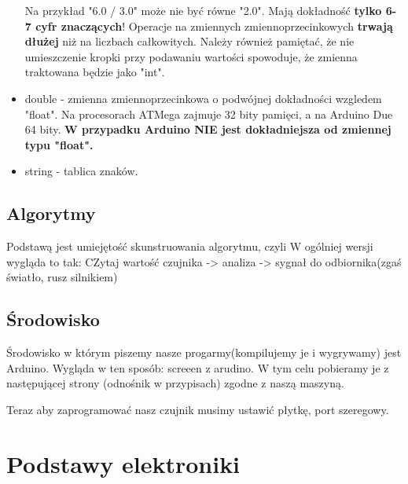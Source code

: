 \begin{itemize}
				Na przykład "6.0 / 3.0" może nie być równe "2.0". Mają dokładność \textbf{tylko 6-7 cyfr znaczących}! Operacje na zmiennych zmiennoprzecinkowych \textbf{trwają dłużej} niż na liczbach całkowitych.
				Należy również pamiętać, że nie umieszczenie kropki przy podawaniu wartości spowoduje, że zmienna traktowana będzie jako "int".
			\item double - zmienna zmiennoprzecinkowa o podwójnej dokładności wzgledem "float". Na procesorach ATMega zajmuje 32 bity pamięci, a na Arduino Due 64 bity.
				\textbf{W przypadku Arduino NIE jest dokładniejsza od zmiennej typu "float".}
			\item string - tablica znaków. 

		\end{itemize}
	
%	  


	\subsection {Algorytmy}
	Podstawą jest umiejętość skunstruowania algorytmu, czyli 
W ogólniej wersji wygląda to tak:
CZytaj wartość czujnika -> analiza -> sygnał do odbiornika(zgaś światło, rusz silnikiem)
	\subsection{Środowisko}
		Środowisko w którym piszemy nasze progarmy(kompilujemy je i wygrywamy) jest Arduino. Wygląda w ten sposób: screeen z arudino. 
W tym celu pobieramy je z następującej strony (odnośnik w przypisach) zgodne z naszą maszyną.

Teraz aby zaprogramować nasz czujnik musimy ustawić płytkę, port szeregowy.%
\newpage
\section{Podstawy elektroniki}
